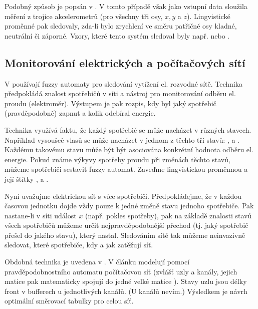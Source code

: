\documentclass[a4paper,10pt]{article}
\begin{document}
Podobný způsob je popsán v \cite{Hul+-ManRecUsProFinStaMacFuzLog}. V tomto případě však jako vstupní data sloužila měření z trojice akcelerometrů (pro všechny tři osy, $x, y$ a $z$). Lingvistické proměnné pak sledovaly, zda-li bylo zrychlení ve směru patřičné osy kladné, neutrální či záporné. Vzory, které tento systém sledoval byly např.  nebo .


\subsection{Monitorování elektrických a počítačových sítí}
V \cite{DucMarMar-AlgBasFiStMacFuzTrNoIntrLoaDis} používají fuzzy automaty pro sledování vytížení el. rozvodné sítě. Technika předpokládá znalost spotřebičů v síti a nástroj pro monitorování odběru el. proudu (elektroměr). Výstupem je pak rozpis, kdy byl jaký spotřebič (pravděpodobně) zapnut a kolik odebíral energie.

Technika využívá faktu, že každý spotřebič se může nacházet v různých stavech. Například vysoušeč vlasů se může nacházet v jednom z těchto tří stavů: ,  a . Každému takovému stavu může být být asociována konkrétní hodnota odběru el. energie.  Pokud známe výkyvy spotřeby proudu při změnách těchto stavů, můžeme spotřebiči sestavit fuzzy automat. Zaveďme lingvistickou proměnnou  a její štítky ,  a . 

Nyní uvažujme elektrickou síť s více spotřebiči. Předpokládejme, že v každou časovou jednotku dojde vždy pouze k jedné změně stavu jednoho spotřebiče. Pak nastane-li v síti událost $x$ (např. pokles spotřeby), pak na základě znalosti stavů všech spotřebičů můžeme určit nejpravděpodobnější přechod (tj. jaký spotřebič přešel do jakého stavu), který nastal. Sledováním sítě tak můžeme neinvazivně sledovat, které spotřebiče, kdy a jak zatěžují síť.


Obdobná technika je uvedena v \cite{Niz-ModComComNetViaPrAu}. V článku modelují pomocí pravděpodobnostního automatu počítačovou síť (zvlášť uzly a kanály, jejich matice pak matematicky spojují do jedné velké matice ). Stavy uzlu jsou délky front v bufferech u jednotlivých kanálů. (U kanálů nevím.) Výsledkem je návrh optimální směrovací tabulky pro celou síť. 
\end{document}
